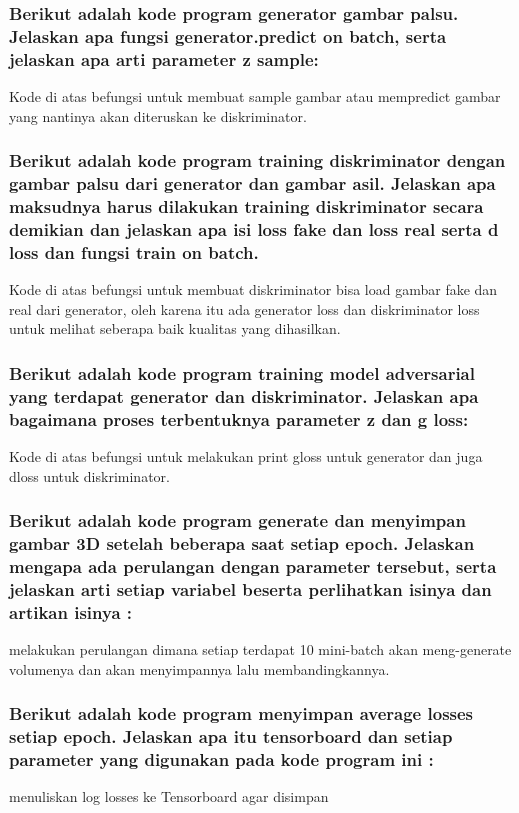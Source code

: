 \subsubsection{Berikut adalah kode program generator gambar palsu. Jelaskan apa fungsi generator.predict on batch, serta jelaskan apa arti parameter z sample:}
\hfill\break

Kode di atas befungsi untuk membuat sample gambar atau mempredict gambar yang nantinya akan diteruskan ke diskriminator.

\subsubsection{Berikut adalah kode program training diskriminator dengan gambar palsu dari generator dan gambar asil. Jelaskan apa maksudnya harus dilakukan training diskriminator secara demikian dan jelaskan apa isi loss fake dan loss real serta d loss dan fungsi train on batch.}
\hfill\break

Kode di atas befungsi untuk membuat diskriminator bisa load gambar fake dan real dari generator, oleh karena itu ada generator loss dan diskriminator loss untuk melihat seberapa baik kualitas yang dihasilkan.

\subsubsection{Berikut adalah kode program training model adversarial yang terdapat generator dan diskriminator. Jelaskan apa bagaimana proses terbentuknya parameter z dan g loss:}
\hfill\break

Kode di atas befungsi untuk melakukan print gloss untuk generator dan juga dloss untuk diskriminator.

\subsubsection{Berikut adalah kode program generate dan menyimpan gambar 3D setelah beberapa saat setiap epoch. Jelaskan mengapa ada perulangan dengan parameter tersebut, serta jelaskan arti setiap variabel beserta perlihatkan isinya dan artikan isinya :}
\hfill\break

melakukan perulangan dimana setiap terdapat 10 mini-batch akan meng-generate volumenya dan akan menyimpannya lalu membandingkannya.

\subsubsection{Berikut adalah kode program menyimpan average losses setiap epoch. Jelaskan apa itu tensorboard dan setiap parameter yang digunakan pada kode program ini :}
\hfill\break

menuliskan log losses ke Tensorboard agar disimpan

